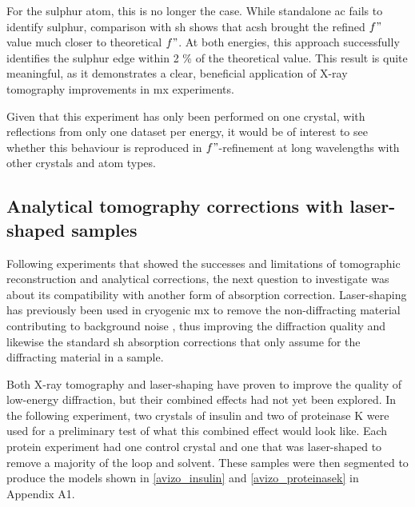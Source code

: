 For the sulphur atom, this is no longer the case. While standalone \ac{ac} fails to identify sulphur, comparison with \ac{sh} shows that \ac{acsh} brought the refined $f"$ value much closer to theoretical $f"$. At both energies, this approach successfully identifies the sulphur edge within 2 \% of the theoretical value. This result is quite meaningful, as it demonstrates a clear, beneficial application of X-ray tomography improvements in \ac{mx} experiments.%

Given that this experiment has only been performed on one crystal, with reflections from only one dataset per energy, it would be of interest to see whether this behaviour is reproduced in $f"$-refinement at long wavelengths with other crystals and atom types. %

\subsection{Analytical tomography corrections with laser-shaped samples}

Following experiments that showed the successes and limitations of tomographic reconstruction and analytical corrections, the next question to investigate was about its compatibility with another form of absorption correction. Laser-shaping has previously been used in cryogenic \ac{mx} to remove the non-diffracting material contributing to background noise \cite{Basu2019}, thus improving the diffraction quality and likewise the standard \ac{sh} absorption corrections that only assume for the diffracting material in a sample.

Both X-ray tomography and laser-shaping have proven to improve the quality of low-energy diffraction, but their combined effects had not yet been explored. In the following experiment, two crystals of insulin and two of proteinase K were used for a preliminary test of what this combined effect would look like. Each protein experiment had one control crystal and one that was laser-shaped to remove a majority of the loop and solvent. These samples were then segmented to produce the models shown in \cref{avizo_insulin} and \cref{avizo_proteinasek} in Appendix A1.

